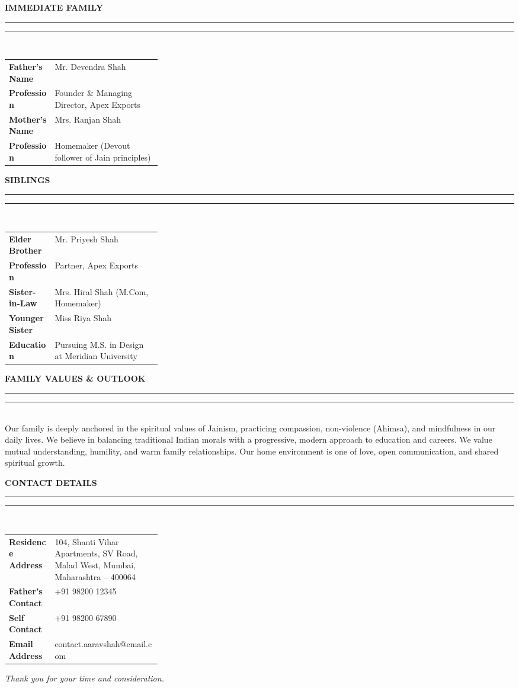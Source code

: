 \documentclass[10pt,letterpaper]{article}
\newcommand{\sectiontitle}[1]{%
  \vspace{0.25cm}%
  {\noindent\color{primary}\fontsize{10.5}{12}\selectfont\sffamily\bfseries\MakeUppercase{#1}} \\[0.15em]
  {\noindent\color{primary}\rule{0.2\linewidth}{1.2pt}}\hfill{\color{lightgray}\rule{0.78\linewidth}{0.4pt}} \\[-0.25em]%
}
\begin{document}
\hfill
\begin{minipage}[t]{0.64\textwidth}
  \sectiontitle{Immediate Family}
  \fontsize{9.5}{12.5}\selectfont\color{charcoal}%
  \begin{tabularx}{\linewidth}{@{}p{0.3\linewidth} X@{}}
    \textbf{Father's Name} & Mr. Devendra Shah \\
    \textbf{Profession} & Founder \& Managing Director, Apex Exports \\
    \textbf{Mother's Name} & Mrs. Ranjan Shah \\
    \textbf{Profession} & Homemaker (Devout follower of Jain principles) \\
  \end{tabularx}
  
  \sectiontitle{Siblings}
  \fontsize{9.5}{12.5}\selectfont\color{charcoal}%
  \begin{tabularx}{\linewidth}{@{}p{0.3\linewidth} X@{}}
    \textbf{Elder Brother} & Mr. Priyesh Shah \\
    \textbf{Profession} & Partner, Apex Exports \\
    \textbf{Sister-in-Law} & Mrs. Hiral Shah (M.Com, Homemaker) \\[0.3em]
    \textbf{Younger Sister} & Miss Riya Shah \\
    \textbf{Education} & Pursuing M.S. in Design at Meridian University \\
  \end{tabularx}
  
  \sectiontitle{Family Values \& Outlook}
  \fontsize{9.5}{13.5}\selectfont\color{charcoal}%
  Our family is deeply anchored in the spiritual values of Jainism, practicing compassion, non-violence (Ahimsa), and mindfulness in our daily lives. We believe in balancing traditional Indian morals with a progressive, modern approach to education and careers. We value mutual understanding, humility, and warm family relationships. Our home environment is one of love, open communication, and shared spiritual growth.
  
  \sectiontitle{Contact Details}
  \fontsize{9.5}{12.5}\selectfont\color{charcoal}%
  \begin{tabularx}{\linewidth}{@{}p{0.3\linewidth} X@{}}
    \textbf{Residence Address} & 104, Shanti Vihar Apartments, SV Road, \newline Malad West, Mumbai, Maharashtra -- 400064 \\[0.3em]
    \textbf{Father's Contact} & +91 98200 12345 \\[0.3em]
    \textbf{Self Contact} & +91 98200 67890 \\[0.3em]
    \textbf{Email Address} & contact.aaravshah@email.com \\
  \end{tabularx}
\end{minipage}

\vfill
\begin{center}
  {\color{secondary}\fontsize{9}{11}\selectfont\textit{Thank you for your time and consideration.}}
\end{center}
\end{document}
